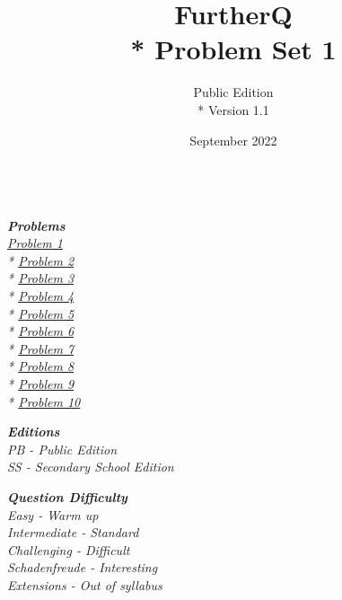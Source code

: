 
\title{FurtherQ \\* Problem Set 1}
\author{Public Edition \\* Version 1.1}
\date{September 2022}




\maketitle
{
\small
\textit{
  \textbf{\\\Large{Problems}}\\
  \large
  \hyperlink{P1}{Problem 1} \\*
  \hyperlink{P2}{Problem 2} \\*
  \hyperlink{P3}{Problem 3} \\*
  \hyperlink{P4}{Problem 4} \\*
  \hyperlink{P5}{Problem 5} \\*
  \hyperlink{P6}{Problem 6} \\*
  \hyperlink{P7}{Problem 7} \\*
  \hyperlink{P8}{Problem 8} \\*
  \hyperlink{P9}{Problem 9} \\*
  \hyperlink{P10}{Problem 10} \\
}

\begin{multicols*}{2}
  \textit{\textbf{\Large{Editions}} \\
          \large
          \hspace*{12pt} PB - Public Edition \\
          \hspace*{12pt} SS - Secondary School Edition \\
  }

  \textit{\textbf{\Large{Question Difficulty}} \\
        \large
        \hspace*{12pt} Easy - Warm up \\
        \hspace*{12pt} Intermediate - Standard \\
        \hspace*{12pt} Challenging - Difficult \\
        \hspace*{12pt} Schadenfreude - Interesting \\
        \hspace*{12pt} Extensions - Out of syllabus
  }


\end{multicols*}}
